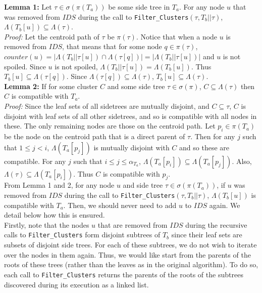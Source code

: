 \documentclass[a4paper]{article}
\begin{document}
    \textbf{Lemma 1:} Let $\tau \in \sigma(\pi(T_a))$ be some side tree in $T_a$. For any node $u$ that was removed from $IDS$ during the call to \texttt{Filter\_Clusters}$(\tau, T_b||\tau)$, $\Lambda(T_b[u]) \subseteq \Lambda(\tau)$.\\
    \textit{Proof:} Let the centroid path of $\tau$ be $\pi(\tau)$. Notice that when a node $u$ is removed from $IDS$, that means that for some node $q \in \pi(\tau)$, $counter(u) = |\Lambda(T_b||\tau[u]) \cap \Lambda(\tau[q])| = |\Lambda(T_b||\tau[u])|$ and $u$ is not spoiled. Since $u$ is not spoiled, $\Lambda(T_b||\tau[u]) = \Lambda(T_b[u])$. Thus $T_b[u] \subseteq \Lambda(\tau[q])$. Since $\Lambda(\tau[q]) \subseteq \Lambda(\tau)$, $T_b[u] \subseteq \Lambda(\tau)$.\\

    \textbf{Lemma 2:} If for some cluster $C$ and some side tree $\tau \in \sigma(\pi)$, $C \subseteq \Lambda(\tau)$ then $C$ is compatible with $T_a$.\\
    \textit{Proof:} Since the leaf sets of all sidetrees are mutually disjoint, and $C \subseteq \tau$, $C$ is disjoint with leaf sets of all other sidetrees, and so is compatible with all nodes in these. The only remaining nodes are those on the centroid path. Let $p_i \in \pi(T_a)$ be the node on the centroid path that is a direct parent of $\tau$. Then for any $j$ such that $1 \leq j < i$, $\Lambda(T_a[p_j])$ is mutually disjoint with $C$ and so these are compatible. For any $j$ such that $i \leq j \leq \alpha_{T_a}$, $\Lambda(T_a[p_i]) \subseteq \Lambda(T_a[p_j])$. Also, $\Lambda(\tau) \subseteq \Lambda(T_a[p_i])$. Thus $C$ is compatible with $p_j$.\\

    From Lemma 1 and 2, for any node $u$ and side tree $\tau \in \sigma(\pi(T_a))$, if $u$ was removed from $IDS$ during the call to \texttt{Filter\_Clusters}$(\tau, T_b||\tau)$, $\Lambda(T_b[u])$ is compatible with $T_a$. Then, we should never need to add $u$ to $IDS$ again. We detail below how this is ensured.\\

    Firstly, note that the nodes $u$ that are removed from $IDS$ during the recursive calls to \texttt{Filter\_Clusters} form disjoint subtrees of $T_b$ since their leaf sets are subsets of disjoint side trees. For each of these subtrees, we do not wish to iterate over the nodes in them again. Thus, we would like start from the parents of the roots of these trees (rather than the leaves as in the original algorithm). To do so, each call to \texttt{Filter\_Clusters} returns the parents of the roots of the subtrees discovered during its execution as a linked list.\\
\end{document}
